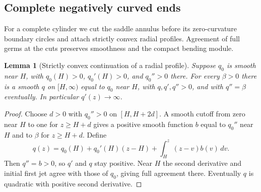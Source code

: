 \documentclass[11pt]{amsart}
\newtheorem{lemma}[theorem]{Lemma}
\theoremstyle{definition}
\theoremstyle{remark}
\numberwithin{equation}{section}
\begin{document}
\subsection{Complete negatively curved ends}\label{sec:complete-cylinder}
For a complete cylinder we cut the saddle annulus before its zero-curvature
boundary circles and attach strictly convex radial profiles. Agreement of
full germs at the cuts preserves smoothness and the compact bending module.

\begin{lemma}[Strictly convex continuation of a radial profile]
\label{lem:complete-profile}
Suppose $q_0$ is smooth near $H$, with $q_0(H)>0$, $q_0'(H)>0$,
and $q_0''>0$ there. For every $\beta>0$ there is a smooth $q$ on
$[H,\infty)$ equal to $q_0$ near $H$, with $q,q',q''>0$, and with
$q''=\beta$ eventually. In particular $q'(z)\to\infty$.
\end{lemma}
\begin{proof}
Choose $d>0$ with $q_0''>0$ on $[H,H+2d]$. A smooth cutoff from zero
near $H$ to one for $z\ge H+d$ gives a positive smooth function $b$
equal to $q_0''$ near $H$ and to $\beta$ for $z\ge H+d$.
Define
\begin{equation}\label{eq:complete-profile}
 q(z)=q_0(H)+q_0'(H)(z-H)+\int_H^z(z-v)b(v)\,dv.
\end{equation}
Then $q''=b>0$, so $q'$ and $q$ stay positive. Near $H$ the second
derivative and initial first jet agree with those of $q_0$, giving full
agreement there. Eventually $q$ is quadratic with positive second derivative.
\end{proof}
\end{document}
